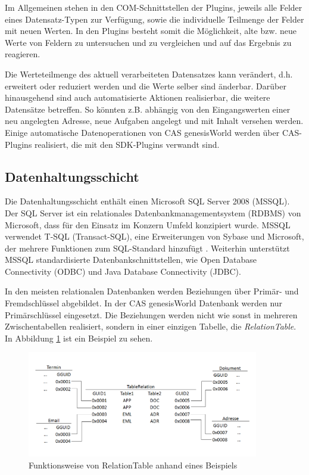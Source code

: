 Im Allgemeinen stehen in den COM-Schnittstellen der Plugins, jeweils alle Felder eines Datensatz-Typen zur Verfügung, sowie die individuelle Teilmenge der Felder mit neuen Werten. In den Plugins besteht somit die Möglichkeit, alte bzw. neue Werte von Feldern zu untersuchen und zu vergleichen und auf das Ergebnis zu reagieren.

Die Werteteilmenge des aktuell verarbeiteten Datensatzes kann verändert, d.h. erweitert oder reduziert werden und die Werte selber sind änderbar. Darüber hinausgehend sind auch automatisierte Aktionen realisierbar, die weitere Datensätze betreffen. So könnten z.B. abhängig von den Eingangswerten einer neu angelegten Adresse, neue Aufgaben angelegt und mit Inhalt versehen werden. Einige automatische Datenoperationen von CAS genesisWorld werden über CAS-Plugins realisiert, die mit den SDK-Plugins verwandt sind.

\subsection{Datenhaltungsschicht}
\label{ch:Systemanalyse:sec:genesisWorld:subsec:db}

Die Datenhaltungsschicht enthält einen Microsoft SQL Server 2008 (MSSQL). Der SQL Server ist ein relationales Datenbankmanagementsystem (RDBMS) von Microsoft, dass für den Einsatz im Konzern Umfeld konzipiert wurde. MSSQL verwendet T-SQL (Transact-SQL), eine Erweiterungen von Sybase und Microsoft, der mehrere Funktionen zum SQL-Standard hinzufügt \cite{tech2013}. Weiterhin unterstützt MSSQL standardisierte Datenbankschnittstellen, wie Open Database Connectivity (ODBC) und Java Database Connectivity (JDBC).
  
In den meisten relationalen Datenbanken werden Beziehungen über Primär- und Fremdschlüssel abgebildet. In der CAS genesisWorld Datenbank werden nur Primärschlüssel eingesetzt. Die Beziehungen werden nicht wie sonst in mehreren Zwischentabellen realisiert, sondern in einer einzigen Tabelle, die \textit{RelationTable}. In Abbildung \ref{gw_2} ist ein Beispiel zu sehen.

\begin{figure}[ht]
	\centering
  \includegraphics[width=0.9\textwidth, width=0.9\textwidth]{pics/gW_tablerealtion.png}
	\caption{Funktionsweise von RelationTable anhand eines Beispiels}
	\label{gw_2}
\end{figure}

